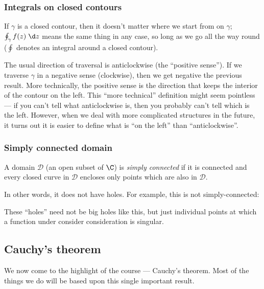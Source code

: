 \documentclass[a4paper]{article}
\begin{document}
\subsubsection*{Integrals on closed contours}
If $\gamma$ is a closed contour, then it doesn't matter where we start from on $\gamma$; $\oint_\gamma f(z)\;\d z$ means the same thing in any case, so long as we go all the way round ($\oint$ denotes an integral around a closed contour).

The usual direction of traversal is anticlockwise (the ``positive sense''). If we traverse $\gamma$ in a negative sense (clockwise), then we get negative the previous result. More technically, the positive sense is the direction that keeps the interior of the contour on the left. This ``more technical'' definition might seem pointless --- if you can't tell what anticlockwise is, then you probably can't tell which is the left. However, when we deal with more complicated structures in the future, it turns out it is easier to define what is ``on the left'' than ``anticlockwise''.

\subsubsection*{Simply connected domain}
\begin{defi}
  A domain $\mathcal{D}$ (an open subset of $\C$) is \emph{simply connected} if it is connected and every closed curve in $\mathcal{D}$ encloses only points which are also in $\mathcal{D}$.
\end{defi}
In other words, it does not have holes. For example, this is not simply-connected:
\begin{center}
\end{center}
These ``holes'' need not be big holes like this, but just individual points at which a function under consider consideration is singular.

\subsection{Cauchy's theorem}
We now come to the highlight of the course --- Cauchy's theorem. Most of the things we do will be based upon this single important result.
\end{document}
